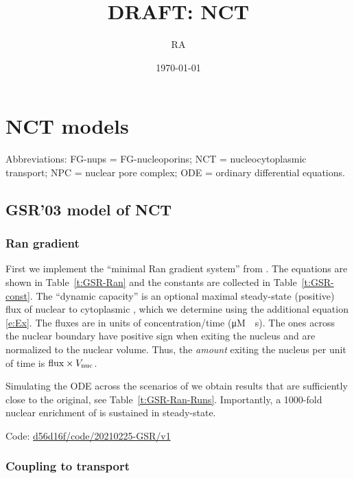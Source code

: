 \documentclass[12pt,notitlepage]{article}
\title{DRAFT: NCT}
\author{RA}
\date{\today}
\begin{document}
\maketitle

\section{NCT models}

Abbreviations:
FG-nups = FG-nucleoporins;
NCT = nucleocytoplasmic transport;
NPC = nuclear pore complex;
ODE = ordinary differential equations.

\subsection{GSR'03 model of NCT} \label{s:GSR03}

\subsubsection*{Ran gradient} \label{s:GSR03:Ran}

First we implement
the ``minimal Ran gradient system'' from 
\cite{GoerlichSeewaldRibbeck2003}.
%
%
The equations are shown in
Table~\ref{t:GSR-Ran}
and
the constants are collected in 
Table~\ref{t:GSR-const}.
%
%
The ``dynamic capacity'' 
is an optional maximal steady-state (positive) flux
of nuclear  to cytoplasmic ,
which we determine using the additional equation \eqref{e:Ex}.
%
%
The fluxes 
are in units of concentration/time (\si{\micro M \per s}).
%
The ones across the nuclear boundary
have positive sign when exiting the nucleus
and are normalized to the nuclear volume.
%
Thus,
the \emph{amount} exiting the nucleus per unit of time is
$\ce{flux} \times V_\text{nuc}$.

%

Simulating the ODE
across the scenarios of 
\cite{GoerlichSeewaldRibbeck2003}
we obtain 
results that are sufficiently close
to the original,
see Table~\ref{t:GSR-Ran-Runs}.
%
%
Importantly,
a 1000-fold nuclear enrichment of 
is sustained in steady-state.

%

Code:
\href{https://github.com/numpde/nct1/tree/d56d16f/code/20210225-GSR/v1}{d56d16f/code/20210225-GSR/v1}

%

\subsubsection*{Coupling to transport} \label{s:GSR03:Imp}
\end{document}
